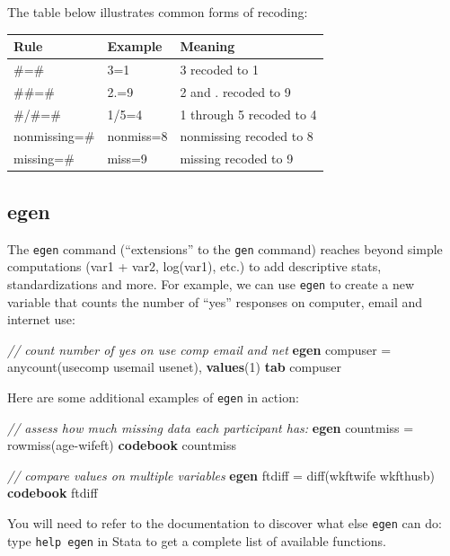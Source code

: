 \documentclass[
]{book}
\newenvironment{Shaded}{\begin{snugshade}}{\end{snugshade}}
\newcommand{\CommentTok}[1]{\textcolor[rgb]{0.56,0.35,0.01}{\textit{#1}}}
\newcommand{\FunctionTok}[1]{\textcolor[rgb]{0.00,0.00,0.00}{#1}}
\newcommand{\KeywordTok}[1]{\textcolor[rgb]{0.13,0.29,0.53}{\textbf{#1}}}
\newcommand{\NormalTok}[1]{#1}
\begin{document}
The table below illustrates common forms of recoding:

\begin{longtable}[]{@{}lll@{}}
\toprule
Rule & Example & Meaning\tabularnewline
\midrule
\endhead
\#=\# & 3=1 & 3 recoded to 1\tabularnewline
\#\#=\# & 2.=9 & 2 and . recoded to 9\tabularnewline
\#/\#=\# & 1/5=4 & 1 through 5 recoded to 4\tabularnewline
nonmissing=\# & nonmiss=8 & nonmissing recoded to 8\tabularnewline
missing=\# & miss=9 & missing recoded to 9\tabularnewline
\bottomrule
\end{longtable}

\hypertarget{egen}{%
\subsection{egen}\label{egen}}

The \texttt{egen} command (``extensions'' to the \texttt{gen} command) reaches beyond simple computations (var1 + var2, log(var1), etc.) to add descriptive stats, standardizations and more. For example, we can use \texttt{egen} to create a new variable that counts the number of ``yes'' responses on computer, email and internet use:

\begin{Shaded}
\begin{Highlighting}[]
\CommentTok{// count number of yes on use comp email and net }
\KeywordTok{egen}\NormalTok{ compuser = }\FunctionTok{anycount}\NormalTok{(usecomp usemail usenet), }\KeywordTok{values}\NormalTok{(1)}
\KeywordTok{tab}\NormalTok{ compuser}
\end{Highlighting}
\end{Shaded}

Here are some additional examples of \texttt{egen} in action:

\begin{Shaded}
\begin{Highlighting}[]
\CommentTok{// assess how much missing data each participant has:}
\KeywordTok{egen}\NormalTok{ countmiss = }\FunctionTok{rowmiss}\NormalTok{(age{-}wifeft)}
\KeywordTok{codebook}\NormalTok{ countmiss}

\CommentTok{// compare values on multiple variables}
\KeywordTok{egen}\NormalTok{ ftdiff = }\FunctionTok{diff}\NormalTok{(wkftwife wkfthusb)}
\KeywordTok{codebook}\NormalTok{ ftdiff}
\end{Highlighting}
\end{Shaded}

You will need to refer to the documentation to discover what else \texttt{egen} can do: type \texttt{help\ egen} in Stata to get a complete list of available functions.
\end{document}
